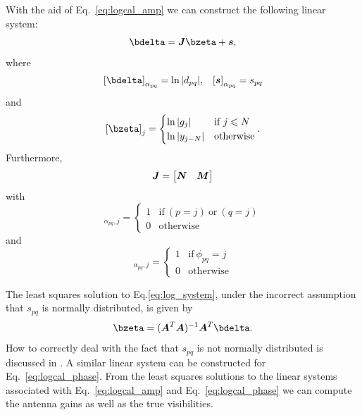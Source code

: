 \documentclass[useAMS,usenatbib]{mn2e}
\newcommand{\bs}{\bmath{s}}
\newcommand{\bA}{\bmath{A}}
\newcommand{\bJ}{\bmath{J}}
\newcommand{\bN}{\bmath{N}}
\newcommand{\bM}{\bmath{M}}
\begin{document}
With the aid of Eq.~\eqref{eq:logcal_amp} we can construct the following linear system:
\begin{equation}
\label{eq:log_system}
\bdelta = \bJ\bzeta + \bs, 
\end{equation}
where
\begin{align}
\left [ \bdelta \right ]_{\alpha_{pq}} &= \ln |d_{pq}|, & \left [ \bs \right ]_{\alpha_{pq}} = s_{pq} 
\end{align}
and
\begin{equation}
\left [ \bzeta \right ]_{j} = \begin{cases} \ln |g_j| & \textrm{if}~j\leq N \\ \ln |y_{j-N}| & \textrm{otherwise} \end{cases}. 
\end{equation}
Furthermore,
\begin{equation}
\bJ = 
\begin{bmatrix}
\bN & \bM
\end{bmatrix}
\end{equation}
with 
\begin{equation}
[\bN]_{\alpha_{pq},j} = \begin{cases}
       1 & \textrm{if}~(p=j)~\textrm{or}~(q=j)\\
       0 & \textrm{otherwise}
      \end{cases}
\end{equation}
and
\begin{equation}
[\bM]_{\alpha_{pq},j} = \begin{cases}
       1 & \textrm{if}~\phi_{pq}=j\\
       0 & \textrm{otherwise}
      \end{cases}
\end{equation}

The least squares solution to Eq.\eqref{eq:log_system}, under the incorrect assumption that $s_{pq}$ is normally distributed, is given by
\begin{equation}
\bzeta = (\bA^T\bA)^{-1} \bA^T\bdelta. 
\end{equation}
How to correctly deal with the fact that $s_{pq}$ is not normally distributed is discussed in \citep{Liu2010}. A similar linear system can be constructed for Eq.~\eqref{eq:logcal_phase}. 
From the least squares solutions to the linear systems associated with Eq.~\eqref{eq:logcal_amp} and Eq.~\eqref{eq:logcal_phase} we can compute the antenna gains as well as the true visibilities.
\end{document}
